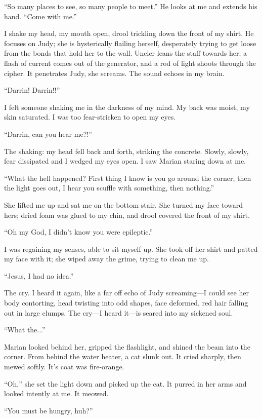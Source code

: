 \documentclass[
]{article}
\begin{document}
``So many places to see, so many people to meet.'' He looks at me and
extends his hand. ``Come with me.''

I shake my head, my mouth open, drool trickling down the front of my
shirt. He focuses on Judy; she is hysterically flailing herself,
desperately trying to get loose from the bonds that hold her to the
wall. Uncler leans the staff towards her; a flash of current comes out
of the generator, and a rod of light shoots through the cipher. It
penetrates Judy, she screams. The sound echoes in my brain.

``Darrin! Darrin!!''

I felt someone shaking me in the darkness of my mind. My back was moist,
my skin saturated. I was too fear-stricken to open my eyes.

``Darrin, can you hear me?!''

The shaking: my head fell back and forth, striking the concrete. Slowly,
slowly, fear dissipated and I wedged my eyes open. I saw Marian staring
down at me.

``What the hell happened? First thing I know is you go around the
corner, then the light goes out, I hear you scuffle with something, then
nothing.''

She lifted me up and sat me on the bottom stair. She turned my face
toward hers; dried foam was glued to my chin, and drool covered the
front of my shirt.

``Oh my God, I didn't know you were epileptic.''

I was regaining my senses, able to sit myself up. She took off her shirt
and patted my face with it; she wiped away the grime, trying to clean me
up.

``Jesus, I had no idea.''

The cry. I heard it again, like a far off echo of Judy screaming---I
could see her body contorting, head twisting into odd shapes, face
deformed, red hair falling out in large clumps. The cry---I heard
it---is seared into my sickened soul.

``What the...''

Marian looked behind her, gripped the flashlight, and shined the beam
into the corner. From behind the water heater, a cat slunk out. It cried
sharply, then mewed softly. It's coat was fire-orange.

``Oh,'' she set the light down and picked up the cat. It purred in her
arms and looked intently at me. It meowed.

``You must be hungry, huh?''
\end{document}
